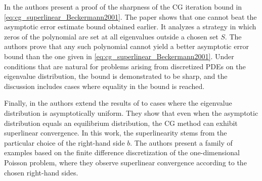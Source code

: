 In \cite{cg_sharp_bound_Beckermann2001} the authors present a proof of the sharpness of the CG iteration bound in \cref{eq:cg_superlinear_Beckermann2001}. The paper shows that one cannot beat the asymptotic error estimate bound obtained earlier. It analyzes a strategy in which zeros of the polynomial are set at all eigenvalues outside a chosen set $S$. The authors prove that any such polynomial cannot yield a better asymptotic error bound than the one given in \cref{eq:cg_superlinear_Beckermann2001}. Under conditions that are natural for problems arising from discretized PDEs on the eigenvalue distribution, the bound is demonstrated to be sharp, and the discussion includes cases where equality in the bound is reached.

Finally, in \cite{cg_superlinear_rhs_Beckermann2002} the authors extend the results of \cite{cg_superlinear_Beckermann2001} to cases where the eigenvalue distribution is asymptotically uniform. They show that even when the asymptotic distribution equals an equilibrium distribution, the CG method can exhibit superlinear convergence. In this work, the superlinearity stems from the particular choice of the right-hand side $b$. The authors present a family of examples based on the finite difference discretization of the one-dimensional Poisson problem, where they observe superlinear convergence according to the chosen right-hand sides.
